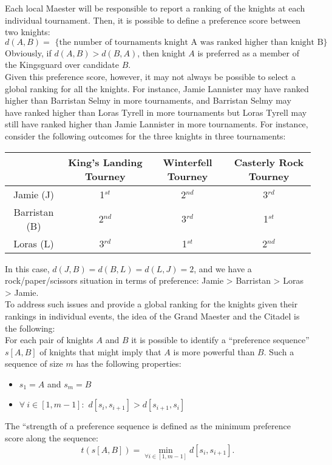 \documentclass[11pt]{article}
\begin{document}
\noindent Each local Maester will be responsible to report a ranking
of the knights at each individual tournament. Then, it is possible to
define a preference score between two knights:
$$d(A,B) = \textrm{ \{ the number of tournaments knight A was ranked
  higher than knight B\} }$$ Obviously, if $d(A,B) > d(B,A)$, then
knight $A$ is preferred as a member of the Kingsguard over candidate
$B$.\\

\noindent Given this preference score, however, it may not always be
possible to select a global ranking for all the knights. For instance,
Jamie Lannister may have ranked higher than Barristan Selmy in more
tournaments, and Barristan Selmy may have ranked higher than Loras
Tyrell in more tournaments but Loras Tyrell may still have ranked
higher than Jamie Lannister in more tournaments. For instance,
consider the following outcomes for the three knights in three
tournaments:

\begin{center}
\begin{tabular}{|c|c|c|c|}
\hline
& King's Landing Tourney  & Winterfell Tourney  & Casterly Rock
Tourney\\
\hline
Jamie (J) & 1$^{st}$ & 2$^{nd}$ & 3$^{rd}$\\
Barristan (B) & 2$^{nd}$ & 3$^{rd}$ & 1$^{st}$\\
Loras (L) & 3$^{rd}$ & 1$^{st}$ & 2$^{nd}$\\
\hline
\end{tabular}
\end{center}

\noindent In this case, $d(J,B) = d(B,L) = d(L,J) = 2$, and we have a
rock/paper/scissors situation in terms of preference: Jamie >
Barristan > Loras > Jamie. \\

\noindent To address such issues and provide a global ranking for the
knights given their rankings in individual events, the idea of the
Grand Maester and the Citadel is the following:\\

\noindent For each pair of knights $A$ and $B$ it is possible to
identify a ``preference sequence'' $s[A,B]$ of knights that might
imply that $A$ is more powerful than $B$. Such a sequence of size $m$
has the following properties:
\begin{itemize}
\item $s_1 = A$ and $s_m = B$
\item $\forall\ i \in [1,m-1]:$ $d[s_i,s_{i+1}] > d[s_{i+1},s_i]$
\end{itemize}
\noindent The ``strength of a preference sequence is defined as the
minimum preference score along the sequence: $$ t( s[A,B] ) =
\min_{\forall i \in [1,m-1]} d[s_i,s_{i+1}].$$ 
\end{document}
